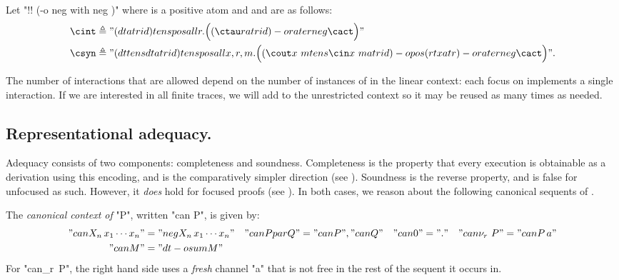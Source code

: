 \documentclass{article}
\begin{document}
\begin{defn}[interaction] \mbox{} \newline
\label{defn:iencoding}
Let "\cinter \triangleq !! (\cact -o neg \cint with neg \csyn)" where \cact is
  a positive atom and \cint and \csyn are as follows:
  \begin{align*}
    \cint &\triangleq "(dt at rid) tens pos all r. \Bigl((\ctau r at rid) -o rate r neg \cact\Bigr)" \\
    \csyn &\triangleq "(dt tens dt at rid) tens pos all x, r, m. \Bigl((\cout x~m tens \cin x~m at rid) -o pos (rt x at r) -o rate r neg \cact \Bigr)".
   \end{align*}
\end{defn}

\noindent
The number of interactions that are allowed depend on the number of instances of
\cinter in the linear context: each focus on \cinter implements a single
interaction. If we are interested in all finite traces, we will add \cinter to
the unrestricted context so it may be reused as many times as needed.

\subsection{Representational adequacy.}
\label{sec:spi.adq}

Adequacy consists of two components: completeness and soundness. Completeness is
the property that every \spi execution is obtainable as a \hyll derivation using
this encoding, and is the comparatively simpler direction (see
). Soundness is the reverse property, and is false for
unfocused \hyll as such. However, it \emph{does} hold for focused proofs (see
). In both cases, we reason about the following canonical sequents
of \hyll.

\begin{defn} The \emph{canonical context of} "P", written "can P", is given by:
  \begin{align*} 
    "can {X_n\,x_1 \cdots x_n}" &= "neg {X_n\,x_1 \cdots x_n}" &
    "can {P par Q}" &= "can P", "can Q" &
    "can 0" &= "." &
    "can {\nu_r\ P}" &= "can{P\,a}" \\
    "can M" &= "dt -o sum M" &
  \end{align*}
  For "can{\nu_r\ P}", the right hand side uses a \emph{fresh} channel "a" that
  is not free in the rest of the sequent it occurs in.
\end{defn}
\end{document}
